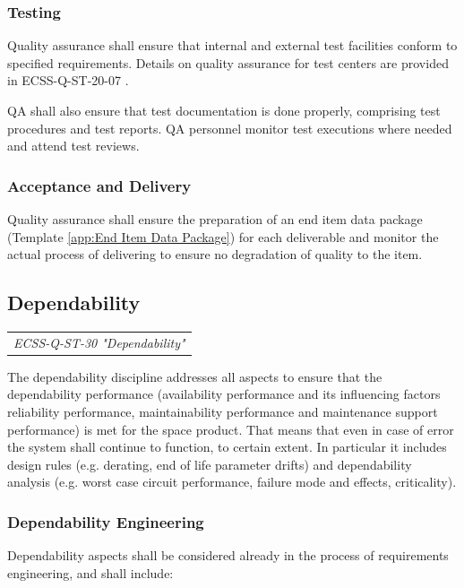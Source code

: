 \subsubsection{Testing}

Quality assurance shall ensure that internal and external test facilities conform to specified requirements. Details on quality assurance for test centers are provided in ECSS-Q-ST-20-07 \cite{ECSS-Q-ST-20-07}.

QA shall also ensure that test documentation is done properly, comprising test procedures and test reports. QA personnel monitor test executions where needed and attend test reviews.

\subsubsection{Acceptance and Delivery}

Quality assurance shall ensure the preparation of an end item data package (Template \ref{app:End Item Data Package}) for each deliverable and monitor the actual process of delivering to ensure no degradation of quality to the item.

\subsection{Dependability}

\begin{tabular}{l}
\textit{ECSS-Q-ST-30 "Dependability" \cite{ECSS-Q-ST-30}}
\end{tabular}

The dependability discipline addresses all aspects to ensure that the dependability performance (availability performance and its influencing factors reliability performance, maintainability performance and maintenance support performance) is met for the space product. That means that even in case of error the system shall continue to function, to certain extent. In particular it includes design rules (e.g. derating, end of life parameter drifts) and dependability analysis (e.g. worst case circuit performance, failure mode and effects, criticality).

\subsubsection{Dependability Engineering}

Dependability aspects shall be considered already in the process of requirements engineering, and shall include:

